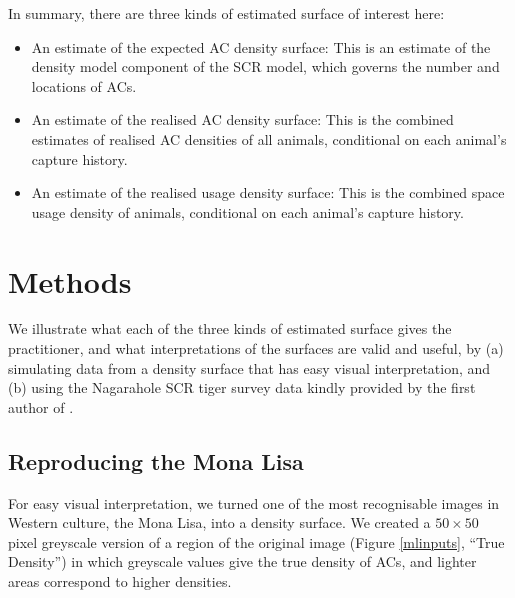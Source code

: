 \documentclass[10pt,a4paper]{article}
\begin{document}
In summary, there are three kinds of estimated surface of interest here: 
\begin{itemize}
\item An estimate of the expected AC density surface: This is an estimate of the density model component of the SCR model, which governs the number and locations of ACs.
\item An estimate of the realised AC density surface: This is the combined estimates of realised AC densities of all animals, conditional on each animal's capture history.
\item An estimate of the realised usage density surface:  This is the combined space usage density of animals, conditional on each animal's capture history.
\end{itemize}

\section{Methods}

We illustrate what each of the three kinds of estimated surface gives the practitioner, and what interpretations of the surfaces are valid and useful, by (a) simulating data from a density surface that has easy visual interpretation, and (b) using the Nagarahole SCR tiger survey data kindly provided by the first author of \cite{Dorazio+Karanth:17}.

\subsection{Reproducing the Mona Lisa} \label{monalisa}

For easy visual interpretation, we turned one of the most recognisable images in Western culture, the Mona Lisa, into a density surface. We created a $50 \times 50$ pixel greyscale version of a region of the original image (Figure \ref{mlinputs}, ``True Density'') in which greyscale values give the true density of ACs, and lighter areas correspond to higher densities.
\end{document}

